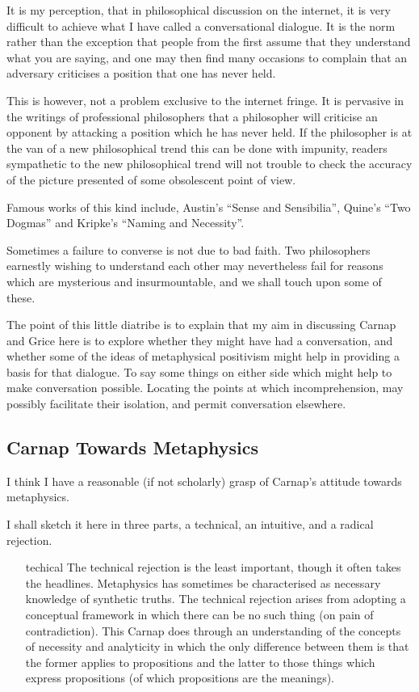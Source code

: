 \documentclass{rbjk}
\begin{document}
\begin{article}
It is my perception, that in philosophical discussion on the internet, it is very difficult to achieve what I have called a conversational dialogue.
It is the norm rather than the exception that people from the first assume that they understand what you are saying, and one may then find many occasions to complain that an adversary criticises a position that one has never held.

This is however, not a problem exclusive to the internet fringe.
It is pervasive in the writings of professional philosophers that a philosopher will criticise an opponent by attacking a position which he has never held.
If the philosopher is at the van of a new philosophical trend this can be done with impunity, readers sympathetic to the new philosophical trend will not trouble to check the accuracy of the picture presented of some obsolescent point of view.

Famous works of this kind include, Austin's ``Sense and Sensibilia'', Quine's ``Two Dogmas'' and Kripke's ``Naming and Necessity''.

Sometimes a failure to converse is not due to bad faith.
Two philosophers earnestly wishing to understand each other may nevertheless fail for reasons which are mysterious and insurmountable, and we shall touch upon some of these.

The point of this little diatribe is to explain that my aim in discussing Carnap and Grice here is to explore whether they might have had a conversation, and whether some of the ideas of metaphysical positivism might help in providing a basis for that dialogue.
To say some things on either side which might help to make conversation possible.
Locating the points at which incomprehension, may possibly facilitate their isolation, and permit conversation elsewhere.

\subsection{Carnap Towards  Metaphysics}

I think I have a reasonable (if not scholarly) grasp of Carnap's attitude towards metaphysics.

I shall sketch it here in three parts, a technical, an intuitive, and a radical rejection.

\begin{itemize}
\item[techical]
The technical rejection is the least important, though it often takes the headlines.
Metaphysics has sometimes be characterised as necessary knowledge of synthetic truths.
The technical rejection arises from adopting a conceptual framework in which there can be no such thing (on pain of contradiction).
This Carnap does through an understanding of the concepts of necessity and analyticity in which the only difference between them is that the former applies to propositions and the latter to those things which express propositions (of which propositions are the meanings).


\end{itemize}
\end{article}
\end{document}
